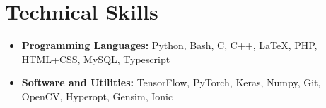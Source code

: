 \section*{Technical Skills}
\begin{itemize}[itemsep=0mm]

\item \textbf{Programming Languages:} Python, Bash, C, C++, \LaTeX, PHP, HTML+CSS, MySQL, Typescript
\item \textbf{Software and Utilities:} TensorFlow, PyTorch, Keras, Numpy, Git, OpenCV, Hyperopt, Gensim, Ionic

\end{itemize}
